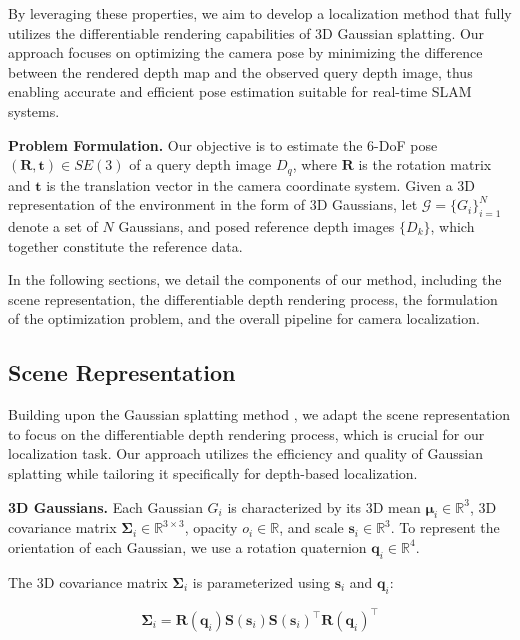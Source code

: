 \documentclass[twocolumn]{article} %
\begin{document}
By leveraging these properties, we aim to develop a localization method
that fully utilizes the differentiable rendering capabilities of 3D
Gaussian splatting. Our approach focuses on optimizing the camera pose
by minimizing the difference between the rendered depth map and the
observed query depth image, thus enabling accurate and efficient pose
estimation suitable for real-time SLAM systems.

\textbf{Problem Formulation.} Our objective is to estimate the 6-DoF
pose \((\mathbf{R}, \mathbf{t}) \in SE(3)\) of a query depth image
\(D_q\), where \(\mathbf{R}\) is the rotation matrix and \(\mathbf{t}\)
is the translation vector in the camera coordinate system. Given a 3D
representation of the environment in the form of 3D Gaussians, let
\(\mathcal{G} = \{G_i\}_{i=1}^N\) denote a set of \(N\) Gaussians, and
posed reference depth images \(\{D_k\}\), which together constitute the
reference data.

In the following sections, we detail the components of our method,
including the scene representation, the differentiable depth rendering
process, the formulation of the optimization problem, and the overall
pipeline for camera localization.

\subsection{Scene Representation}\label{scene-representation}

Building upon the Gaussian splatting method
\cite{kerbl3DGaussianSplatting2023}, we adapt the scene
representation to focus on the differentiable depth rendering process,
which is crucial for our localization task. Our approach utilizes the
efficiency and quality of Gaussian splatting while tailoring it
specifically for depth-based localization.

\textbf{3D Gaussians.} Each Gaussian \(G_i\) is characterized by its 3D
mean \(\boldsymbol{\mu}_i \in \mathbb{R}^3\), 3D covariance matrix
\(\boldsymbol{\Sigma}_i \in \mathbb{R}^{3\times3}\), opacity
\(o_i \in \mathbb{R}\), and scale \(\mathbf{s}_i \in \mathbb{R}^3\). To
represent the orientation of each Gaussian, we use a rotation quaternion
\(\mathbf{q}_i \in \mathbb{R}^4\).

The 3D covariance matrix \(\boldsymbol{\Sigma}_i\) is parameterized
using \(\mathbf{s}_i\) and \(\mathbf{q}_i\):

\[
\boldsymbol{\Sigma}_i = \mathbf{R}(\mathbf{q}_i) \mathbf{S}(\mathbf{s}_i) \mathbf{S}(\mathbf{s}_i)^\top \mathbf{R}(\mathbf{q}_i)^\top
\]
\end{document}
